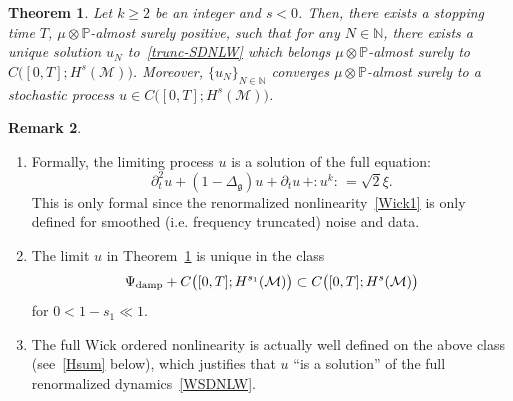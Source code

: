 \documentclass[10pt]{amsart}
\newtheorem{theo}{Theorem}[section]
\theoremstyle{definition}\newtheorem{defi}[theo]{Definition}\newtheorem{rema}[theo]{Remark}\newtheorem{exam}[theo]{Example}\newtheorem{exem}[theo]{Example}\newtheorem{nota}[theo]{Notation}
\newcommand{\damp}{\textup{damp}}
\newcommand{\Prob}{\mathbb{P}}
\newcommand{\N}{\mathbb{N}}
\newcommand{\M}{\mathcal{M}}
\newcommand{\g}{\mathfrak{g}}
\newcommand{\Dlg}{\Delta_{\g}}
\newcommand{\dt}{\partial_t}
\newcommand*{\romanenumi}{\renewcommand*{\theenumi}{\roman{enumi}}}
\begin{document}
\begin{theo}\label{thm-SDNLW}
Let $k\ge 2$ be an integer and $s < 0$. Then, there exists a stopping time $T$, $\mu\otimes\Prob$-almost surely positive, such that for any $N\in \N$, there exists a unique solution $u_N $ to~\eqref{trunc-SDNLW} which belongs $\mu\otimes\Prob$-almost surely to $C\big([0,T];H^{s}(\M)\big)$. Moreover, $\{u_N\}_{N\in\N}$ converges $\mu\otimes\Prob$-almost surely to a stochastic process $u\in C\big([0,T];H^{s}(\M)\big)$.
\end{theo}



\begin{rema}\label{REM:X1}\leavevmode
\begin{enumerate}\romanenumi
\item\label{rema1.3.i} Formally, the limiting process $u$ is a solution of the full equation:
\begin{equation}\label{WSDNLW}
\dt^2 u +(1-\Dlg)u +\dt u \,+ :\!u^k\!:\, = \sqrt{2}\xi.
\end{equation}
This is only formal since the renormalized nonlinearity~\eqref{Wick1} is only defined for smoothed (i.e. frequency truncated) noise and data.
%

\item\label{rema1.3.ii} The limit $u$ in Theorem~\ref{thm-SDNLW} is unique in the class
\begin{align*}
\Psi_{\damp} + C\big([0,T]; H^{s_1}(\M)\big)\subset C\big([0,T];H^{s}(\M)\big)
\end{align*}
for $0<1-s_1\ll 1$.


\item\label{rema1.3.iii} The full Wick ordered nonlinearity is actually well defined on the above class (see~\eqref{Hsum} below), which justifies that $u$ ``is a solution'' of the full renormalized dynamics~\eqref{WSDNLW}.
\end{enumerate}
\end{rema}
\end{document}
